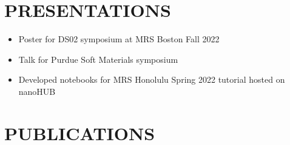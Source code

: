 \chapter{PRESENTATIONS}
\label{sec:orgcd78d4b}
\begin{itemize}
\item Poster for DS02 symposium at MRS Boston Fall 2022
\autocite{2022-novel-halid}
\item Talk for Purdue Soft Materials symposium
\autocite{2022-machin-learn}
\item Developed notebooks
\autocite{manganaris-2022-mrs-comput}
for MRS Honolulu Spring 2022 tutorial hosted on nanoHUB
\autocite{2022-ds00-tutor}
\end{itemize}

\chapter{PUBLICATIONS}
\label{sec:org052c030}

\nocite{manganaris-2022-mrs-comput}
\nocite{yang-2023-high-throug}
\nocite{manganaris-2023-multi-fidel}
\nocite{gollapalli-2023-graph-neural}
\nocite{edlabadkar-2023-drivin-halid}
\nocite{yang-2023-discov-novel}

\makeatletter
{}
{\endlist}
{\item}
\makeatother

\printbibliography[heading=none,category=myarticles]
